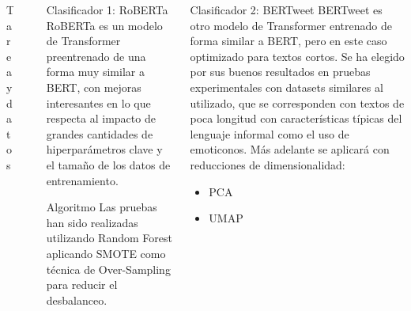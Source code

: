 \documentclass[final]{beamer}
\newlength{\sepwid}
\newlength{\onecolwid}
\newlength{\twocolwid}
\begin{document}
\begin{frame}[t]
\begin{columns}[t]
\begin{column}{\onecolwid}
\begin{block}{Tarea y datos}
\end{block}
\end{column} %


\begin{column}{\sepwid}\end{column} %
    
    \begin{column}{\twocolwid} %
                \begin{columns}[t,totalwidth=\twocolwid] %
            \begin{column}{\onecolwid} %
            \begin{block}{Clasificador 1: RoBERTa}
            RoBERTa es un modelo de Transformer preentrenado de una forma muy similar a BERT, con mejoras interesantes en lo que respecta al impacto de grandes cantidades de hiperparámetros clave y el tamaño de los datos de entrenamiento.
            \end{block}
            \begin{block}{Algoritmo}
            Las pruebas han sido realizadas utilizando Random Forest aplicando SMOTE \cite{chawla2002smote} como técnica de Over-Sampling para reducir el desbalanceo.
            \end{block}
            \end{column} %

            \begin{column}{\onecolwid} %
            \begin{block}{Clasificador 2: BERTweet}
            BERTweet es otro modelo de Transformer entrenado de forma similar a BERT, pero en este caso optimizado para textos cortos. Se ha elegido por sus buenos resultados en pruebas experimentales \cite{guo-etal-2020-benchmarking} con datasets similares al utilizado, que se corresponden con textos de poca longitud con características típicas del lenguaje informal como el uso de emoticonos. Más adelante se aplicará con reducciones de dimensionalidad:
            \begin{itemize}
            \item PCA
            \item UMAP
            \end{itemize}
            \end{block}
            \end{column} %
        \end{columns} %
        

\end{column}
\end{columns}
\end{frame}
\end{document}
